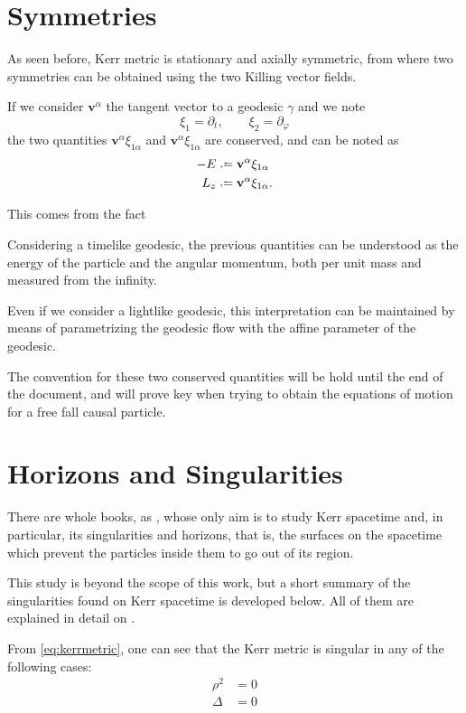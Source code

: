 \section{Symmetries}

As seen before, Kerr metric is stationary and axially symmetric, from where two symmetries can be obtained using the two Killing vector fields.

If we consider $\mathbf{v}^\alpha$ the tangent vector to a geodesic $\gamma$ and we note
\[
	\xi_1 = \partial_t, \qquad \xi_2 = \partial_\varphi
\]
the two quantities $\mathbf{v}^\alpha \xi_{1\alpha}$ and $\mathbf{v}^\alpha \xi_{1\alpha}$ are conserved, and can be noted as
\begin{align}
	\label{eq:energy}
	-E &\defeq \mathbf{v}^\alpha \xi_{1\alpha} \\
	L_z &\defeq \mathbf{v}^\alpha \xi_{1\alpha}.
\end{align}

This comes from the fact 

Considering a timelike geodesic, the previous quantities can be understood as the energy of the particle and the angular momentum, both per unit mass and measured from the infinity.

Even if we consider a lightlike geodesic, this interpretation can be maintained by means of parametrizing the geodesic flow with the affine parameter of the geodesic.

The convention for these two conserved quantities will be hold until the end of the document, and will prove key when trying to obtain the equations of motion for a free fall causal particle.


\section{Horizons and Singularities}

There are whole books, as \cite{oneill95}, whose only aim is to study Kerr spacetime and, in particular, its singularities and horizons, that is, the surfaces on the spacetime which prevent the particles inside them to go out of its region.

This study is beyond the scope of this work, but a short summary of the singularities found on Kerr spacetime is developed below. All of them are explained in detail on \cite[Sec. 2.4]{galindo14}.

From \autoref{eq:kerrmetric}, one can see that the Kerr metric is singular in any of the following cases:
\begin{align}
	\rho^2 &= 0 \\
	\Delta &= 0
\end{align}


